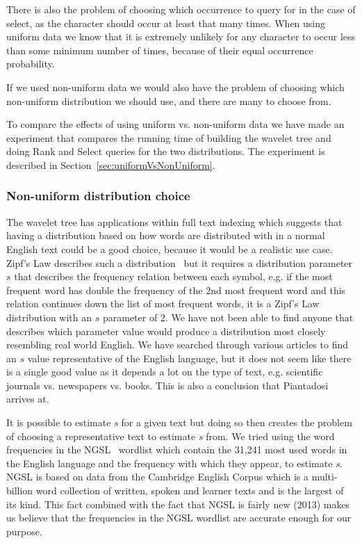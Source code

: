 There is also the problem of choosing which occurrence to query for in the case of select, as the character should occur at least that many times.
When using uniform data we know that it is extremely unlikely for any character to occur less than some minimum number of times, because of their equal occurrence probability.

If we used non-uniform data we would also have the problem of choosing which non-uniform distribution we should use, and there are many to choose from.

To compare the effects of using uniform vs. non-uniform data we have made an experiment that compares the running time of building the wavelet tree and doing Rank and Select queries for the two distributions. 
The experiment is described in Section~\ref{sec:uniformVsNonUniform}.

\subsubsection{Non-uniform distribution choice}
The wavelet tree has applications within full text indexing which suggests that having a distribution based on how words are distributed with in a normal English text could be a good choice, because it would be a realistic use case. 
Zipf's Law describes such a distribution~ but it requires a distribution parameter $s$ that describes the frequency relation between each symbol, e.g. if the most frequent word has double the frequency of the 2nd most frequent word and this relation continues down the list of most frequent words, it is a Zipf's Law distribution with an $s$ parameter of 2.
We have not been able to find anyone that describes which parameter value would produce a distribution most closely resembling real world English. 
We have searched through various articles to find an $s$ value representative of the English language, but it does not seem like there is a single good value as it depends a lot on the type of text, e.g. scientific journals vs. newspapers vs. books.
This is also a conclusion that Piantadosi~ arrives at.

It is possible to estimate \textit{s} for a given text but doing so then creates the problem of choosing a representative text to estimate \textit{s} from.
We tried using the word frequencies in the NGSL~ wordlist which contain the 31,241 most used words in the English language and the frequency with which they appear, to estimate \textit{s}.
NGSL is based on data from the Cambridge English Corpus which is a multi-billion word collection of written, spoken and learner texts and is the largest of its kind.
This fact combined with the fact that NGSL is fairly new (2013) makes us believe that the frequencies in the NGSL wordlist are accurate enough for our purpose.

